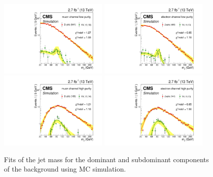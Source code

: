 \begin{figure}[p]
\centering
\includegraphics[width=0.47\textwidth]{figures/fits/bkgMjMLP.pdf}
\includegraphics[width=0.47\textwidth]{figures/fits/bkgMjELP.pdf}\newline
\includegraphics[width=0.47\textwidth]{figures/fits/bkgMjMHP.pdf}
\includegraphics[width=0.47\textwidth]{figures/fits/bkgMjEHP.pdf}\newline
\caption[Jet mass fits in MC]{Fits of the jet mass for the dominant and subdominant components of the background using MC simulation.}
\label{fig:fits_MJ}
\end{figure}

